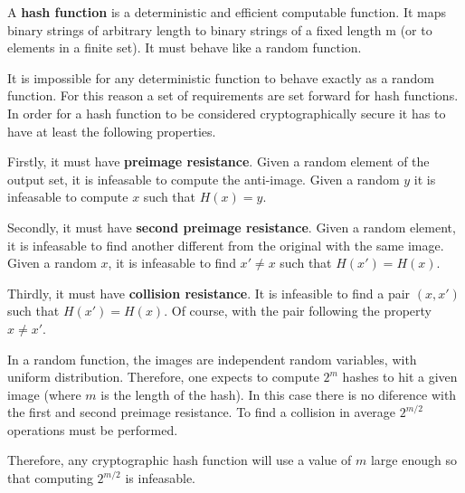 A \textbf{hash function} is a deterministic and efficient computable function.
It maps binary strings of arbitrary length to binary strings of a fixed length m (or to elements in a finite set).
It must behave like a random function.

It is impossible for any deterministic function to behave exactly as a random function.
For this reason a set of requirements are set forward for hash functions.
In order for a hash function to be considered cryptographically secure it has to have at least the following properties.

Firstly, it must have \textbf{preimage resistance}.
Given a random element of the output set, it is infeasable to compute the anti-image.
Given a random $y$ it is infeasable to compute $x$ such that $H(x) = y$.

Secondly, it must have \textbf{second preimage resistance}.
Given a random element, it is infeasable to find another different from the original with the same image.
Given a random $x$, it is infeasable to find $x' \neq x$ such that $H(x') = H(x)$.

Thirdly, it must have \textbf{collision resistance}.
It is infeasible to find a pair $(x, x')$ such that $H(x') = H(x)$.
Of course, with the pair following the property $x \neq x'$.

In a random function, the images are independent random variables, with uniform distribution.
Therefore, one expects to compute $2^m$ hashes to hit a given image (where $m$ is the length of the hash).
In this case there is no diference with the first and second preimage resistance.
To find a collision in average $2^{m/2}$ operations must be performed.

Therefore, any cryptographic hash function will use a value of $m$ large enough so that computing $2^{m/2}$ is infeasable.
